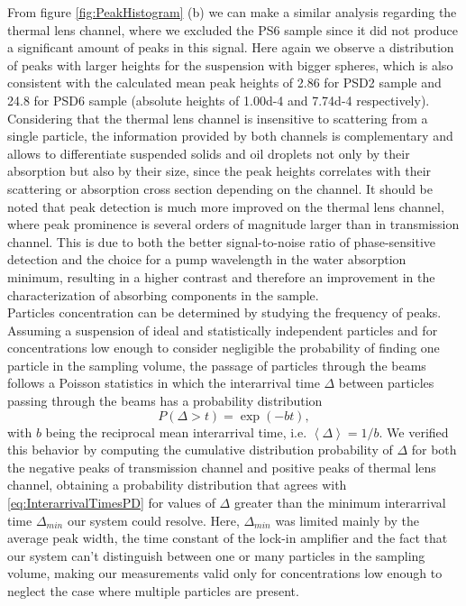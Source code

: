 \documentclass[9pt,twocolumn,twoside]{osajnl}
\begin{document}
From figure \ref{fig:PeakHistogram} (b) we can make a similar analysis regarding the thermal lens channel, where we excluded the PS6 sample since it did not produce a significant amount of peaks in this signal. Here again we observe a distribution of peaks with larger heights for the suspension with bigger spheres, which is also consistent with the calculated mean peak heights of \SI{2.86}{} for PSD2 sample and \SI{24.8}{} for PSD6 sample (absolute heights of \SI{1.00d-4}{} and \SI{7.74d-4}{} respectively). Considering that the thermal lens channel is insensitive to scattering from a single particle, the information provided by both channels is complementary and allows to differentiate suspended solids and oil droplets not only by their absorption but also by their size, since the peak heights correlates with their scattering or absorption cross section depending on the channel. It should be noted that peak detection is much more improved on the thermal lens channel, where peak prominence is several orders of magnitude larger than in transmission channel. This is due to both the better signal-to-noise ratio of phase-sensitive detection and the choice for a pump wavelength in the water absorption minimum, resulting in a higher contrast and therefore an improvement in the characterization of absorbing components in the sample. \\

Particles concentration can be determined by studying the frequency of peaks. Assuming a suspension of ideal and statistically independent particles and for concentrations low enough to consider negligible the probability of finding one particle in the sampling volume, the passage of particles through the beams follows a Poisson statistics in which the interarrival time $\Delta$ between particles passing through the beams has a probability distribution
\begin{equation}
	P\left(\Delta > t\right) = \exp\left( -b t \right),
\label{eq:InterarrivalTimesPD}
\end{equation}
with $b$ being the reciprocal mean interarrival time, i.e. $\left\langle \Delta \right\rangle = 1/b$. We verified this behavior by computing the cumulative distribution probability of $\Delta$ for both the negative peaks of transmission channel and positive peaks of thermal lens channel, obtaining a probability distribution that agrees with \ref{eq:InterarrivalTimesPD} for values of $\Delta$ greater than the minimum interarrival time $\Delta_{min}$ our system could resolve. Here, $\Delta_{min}$ was limited mainly by the average peak width, the time constant of the lock-in amplifier and the fact that our system can't distinguish between one or many particles in the sampling volume, making our measurements valid only for concentrations low enough to neglect the case where multiple particles are present.
\end{document}
